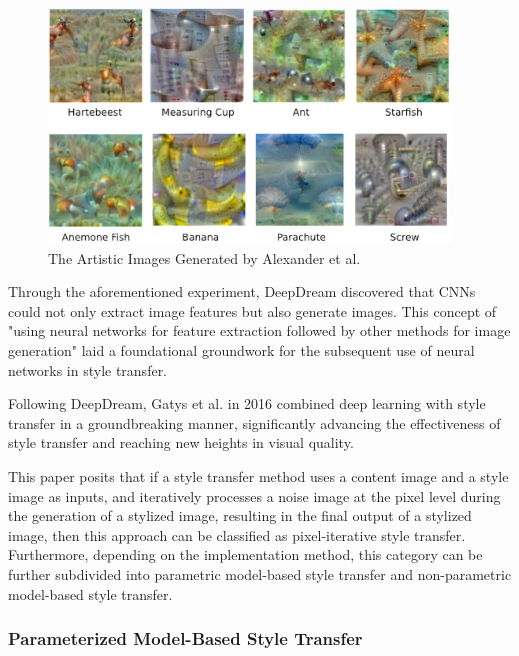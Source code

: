 \begin{figure}[htbp]%
    \centering%
    \includegraphics[width=0.95\textwidth]{fig/Alex_classvis.png}
    \caption{The Artistic Images Generated by Alexander et al.\citep{24mordvintsev2015inceptionism}}\label{fig2}
\end{figure}


Through the aforementioned experiment, DeepDream discovered that CNNs could not only extract image features but also generate images. This concept of "using neural networks for feature extraction followed by other methods for image generation" laid a foundational groundwork for the subsequent use of neural networks in style transfer.

Following DeepDream, Gatys et al. \citep{02gatys2016image} in 2016 combined deep learning with style transfer in a groundbreaking manner, significantly advancing the effectiveness of style transfer and reaching new heights in visual quality.

This paper posits that if a style transfer method uses a content image and a style image as inputs, and iteratively processes a noise image at the pixel level during the generation of a stylized image, resulting in the final output of a stylized image, then this approach can be classified as pixel-iterative style transfer. Furthermore, depending on the implementation method, this category can be further subdivided into parametric model-based style transfer and non-parametric model-based style transfer.

\subsubsection{Parameterized Model-Based Style Transfer}

